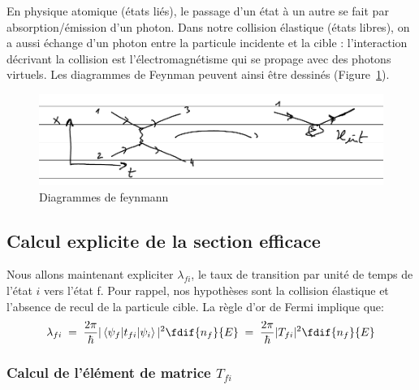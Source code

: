 En physique atomique (états liés), le passage d'un état à un autre se fait par absorption/émission d'un photon. Dans notre collision élastique (états libres), on a aussi échange d'un photon entre la particule incidente et la cible : l'interaction décrivant la collision est l'électromagnétisme qui se propage avec des photons virtuels. Les diagrammes de Feynman peuvent ainsi être dessinés (Figure~\ref{fig:feynmann_diagram}).
 \begin{figure}[htpb]
    \centering
    \includegraphics[scale=0.80]{Images4/partie 4 - interaction.PNG}
    \caption{Diagrammes de feynmann}
    \label{fig:feynmann_diagram}
\end{figure}



\subsection{Calcul explicite de la section efficace}


Nous allons maintenant expliciter $\lambda_{fi}$, le taux de transition par unité de temps de l'état $i$ vers l'état f. Pour rappel, nos hypothèses sont la collision élastique et l'absence de recul de la particule cible. La règle d'or de Fermi implique que:
\[
    \lambda_{fi} 
    \eq
    \dfrac{2\pi}{\hbar }|\mel{\psi_f}{t_{fi}}{\psi_i}|^2 \fdif{n_f}{E}
    \eq
    \dfrac{2\pi}{\hbar }|T_{fi}|^2 \fdif{n_f}{E}
\]

\subsubsection{Calcul de l'élément de matrice $T_{fi}$}\label{calcul_Tfi}

